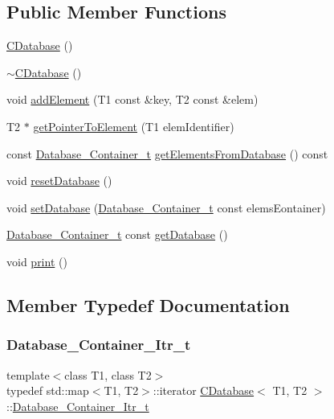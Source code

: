 \subsection*{Public Member Functions}
\begin{DoxyCompactItemize}
\item 
\hyperlink{classCDatabase_ac5fd82bb19a12e500d2f65cbd919c256}{C\+Database} ()
\item 
\hyperlink{classCDatabase_a2b3592b975d43dfb06e4bac2a4245c7b}{$\sim$\+C\+Database} ()
\item 
void \hyperlink{classCDatabase_a269a0a23ba838e0c6ce533017a0d635a}{add\+Element} (T1 const \&key, T2 const \&elem)
\item 
T2 $\ast$ \hyperlink{classCDatabase_a708130facbed33fd15956bf3cf760372}{get\+Pointer\+To\+Element} (T1 elem\+Identifier)
\item 
const \hyperlink{classCDatabase_ac20411b7c5997877aebb46d0bd3a8461}{Database\+\_\+\+Container\+\_\+t} \hyperlink{classCDatabase_a2ecfd5ba202cea2332ddcd59237baf8e}{get\+Elements\+From\+Database} () const
\item 
void \hyperlink{classCDatabase_a96f398964530b48ad7fc63c05783369f}{reset\+Database} ()
\item 
void \hyperlink{classCDatabase_a695c6bbbf0fc27a07cd520a5eda81128}{set\+Database} (\hyperlink{classCDatabase_ac20411b7c5997877aebb46d0bd3a8461}{Database\+\_\+\+Container\+\_\+t} const elems\+Eontainer)
\item 
\hyperlink{classCDatabase_ac20411b7c5997877aebb46d0bd3a8461}{Database\+\_\+\+Container\+\_\+t} const \hyperlink{classCDatabase_a7991d341e324528af43b4a1a2a09f39f}{get\+Database} ()
\item 
void \hyperlink{classCDatabase_aeaff36fd440603cb8308676c7e4eb296}{print} ()
\end{DoxyCompactItemize}


\subsection{Member Typedef Documentation}
\mbox{\label{classCDatabase_a07aa3db528b07931347d91ebf505b8ed}} 
\subsubsection{\texorpdfstring{Database\+\_\+\+Container\+\_\+\+Itr\+\_\+t}{Database\_Container\_Itr\_t}}
{\footnotesize\ttfamily template$<$class T1, class T2$>$ \\
typedef std\+::map$<$T1, T2$>$\+::iterator \hyperlink{classCDatabase}{C\+Database}$<$ T1, T2 $>$\+::\hyperlink{classCDatabase_a07aa3db528b07931347d91ebf505b8ed}{Database\+\_\+\+Container\+\_\+\+Itr\+\_\+t}}

